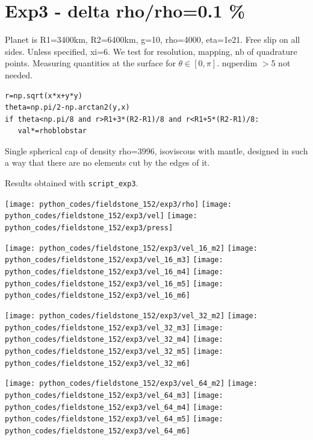 \newpage
\section{Exp3 - delta rho/rho=0.1 \%}

Planet is R1=3400km, R2=6400km, g=10, rho=4000, eta=1e21.
Free slip on all sides. Unless specified, xi=6.
We test for resolution, mapping, nb of quadrature points.
Measuring quantities at the surface for $\theta\in[0,\pi]$.
nqperdim $>$5  not needed. 

\begin{lstlisting}
r=np.sqrt(x*x+y*y)
theta=np.pi/2-np.arctan2(y,x)
if theta<np.pi/8 and r>R1+3*(R2-R1)/8 and r<R1+5*(R2-R1)/8:
   val*=rhoblobstar
\end{lstlisting}

Single spherical cap of density rho=3996, isoviscous with mantle,
designed in such a way that there are no elements cut by the edges of it.

Results obtained with {\tt script\_exp3}.

\begin{center}
\texttt{[image: python\_codes/fieldstone\_152/exp3/rho]}
\texttt{[image: python\_codes/fieldstone\_152/exp3/vel]}
\texttt{[image: python\_codes/fieldstone\_152/exp3/press]}
\end{center}

\noindent
\texttt{[image: python\_codes/fieldstone\_152/exp3/vel\_16\_m2]}
\texttt{[image: python\_codes/fieldstone\_152/exp3/vel\_16\_m3]}
\texttt{[image: python\_codes/fieldstone\_152/exp3/vel\_16\_m4]}
\texttt{[image: python\_codes/fieldstone\_152/exp3/vel\_16\_m5]}
\texttt{[image: python\_codes/fieldstone\_152/exp3/vel\_16\_m6]}

\noindent
\texttt{[image: python\_codes/fieldstone\_152/exp3/vel\_32\_m2]}
\texttt{[image: python\_codes/fieldstone\_152/exp3/vel\_32\_m3]}
\texttt{[image: python\_codes/fieldstone\_152/exp3/vel\_32\_m4]}
\texttt{[image: python\_codes/fieldstone\_152/exp3/vel\_32\_m5]}
\texttt{[image: python\_codes/fieldstone\_152/exp3/vel\_32\_m6]}

\noindent
\texttt{[image: python\_codes/fieldstone\_152/exp3/vel\_64\_m2]}
\texttt{[image: python\_codes/fieldstone\_152/exp3/vel\_64\_m3]}
\texttt{[image: python\_codes/fieldstone\_152/exp3/vel\_64\_m4]}
\texttt{[image: python\_codes/fieldstone\_152/exp3/vel\_64\_m5]}
\texttt{[image: python\_codes/fieldstone\_152/exp3/vel\_64\_m6]}

